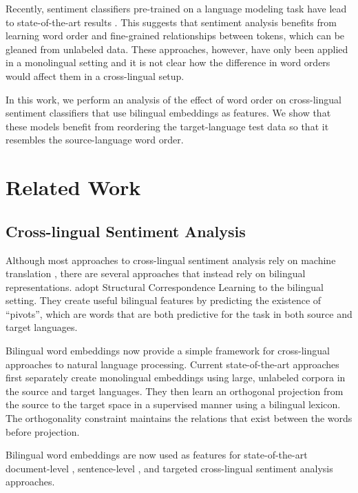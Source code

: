\documentclass[11pt,a4paper]{article}
\begin{document}
Recently, sentiment classifiers pre-trained on a language modeling task have lead to state-of-the-art results \cite{Peters2018,Howard2018,Devlin2018}. This suggests that sentiment analysis benefits from learning word order and fine-grained relationships between tokens, which can be gleaned from unlabeled data. These approaches, however, have only been applied in a monolingual setting and it is not clear how the difference in word orders would affect them in a cross-lingual setup.

In this work, we perform an analysis of the effect of word order on cross-lingual sentiment classifiers that use bilingual embeddings as features. We show that these models benefit from reordering the target-language test data so that it resembles the source-language word order.


\section{Related Work}

\subsection{Cross-lingual Sentiment Analysis}

Although most approaches to cross-lingual sentiment analysis rely on machine translation \cite{Banea2008,Balahur2014d,Klinger2015},
there are several approaches that instead rely on bilingual representations. 
 adopt Structural Correspondence Learning to the
bilingual setting. They create useful bilingual features by predicting the existence
of ``pivots'', which are words that are both predictive for the task in both source and target languages.

Bilingual word embeddings \cite{Kocisky2014,Chandar2014,Luong2015} now provide
a simple framework for cross-lingual approaches to natural language processing. 
Current state-of-the-art approaches \cite{Artetxe2017,Artetxe2018,Lample2017} first separately create monolingual embeddings using large, unlabeled corpora in the source and target languages. They then learn an orthogonal projection from the source to the target space in a supervised manner using a bilingual lexicon. The orthogonality constraint maintains the relations that exist between the words before projection.

Bilingual word embeddings are now used as features for state-of-the-art document-level \cite{Chen2016}, sentence-level \cite{Barnes2018b}, and targeted \cite{Hangya2018} cross-lingual sentiment analysis approaches.
\end{document}
